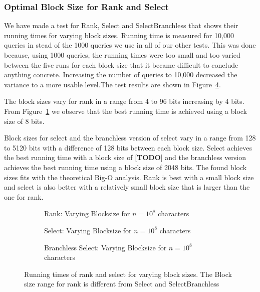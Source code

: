 \subsubsection{Optimal Block Size for Rank and Select}
\label{sec:OptimalBlockSizeForRankAndSelect}
We have made a test for Rank, Select and SelectBranchless that shows their running times for varying block sizes.
Running time is measured for 10,000 queries in stead of the 1000 queries we use in all of our other tests. 
This was done because, using 1000 queries, the running times were too small and too varied between the five runs for each block size that it became difficult to conclude anything concrete. 
Increasing the number of queries to 10,000 decreased the variance to a more usable level.The test results are shown in Figure~\ref{fig:CumulativeSumBlockSize}.

The block sizes vary for rank in a range from 4 to 96 bits increasing by 4 bits.
From Figure~\ref{fig:CumulativeSumBlockSizeWallTimeRank} we observe that the best running time is achieved using a block size of 8 bits. 

Block sizes for select and the branchless version of select vary in a range from 128 to 5120 bits with a difference of 128 bits between each block size. 
Select achieves the best running time with a block size of [\textbf{TODO}] and the branchless version achieves the best running time using a block size of 2048 bits.
The found block sizes fits with the theoretical Big-O analysis.
Rank is best with a small block size and select is also better with a relatively small block size that is larger than the one for rank.


\begin{figure}\tiny
\begin{subfigure}{0.45\textwidth}
	
	\caption{Rank: Varying Blocksize for $n=10^8$ characters}
	\label{fig:CumulativeSumBlockSizeWallTimeRank}
\end{subfigure}
\hfill
\begin{subfigure}{0.45\textwidth}
	
	\caption{Select: Varying Blocksize for $n=10^8$ characters}
	\label{fig:CumulativeSumBlockSizeWallTimeSelect}
\end{subfigure}

\begin{subfigure}{0.45\textwidth}
	
	\caption{Branchless Select: Varying Blocksize for $n=10^8$ characters}
	\label{fig:CumulativeSumBlockSizeWallTimeSelectBranchless}
\end{subfigure}

\caption{Running times of rank and select for varying block sizes. The Block size range for rank is different from Select and SelectBranchless}
\label{fig:CumulativeSumBlockSize}
\end{figure}

